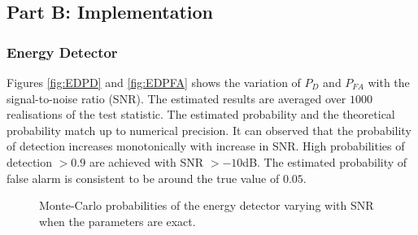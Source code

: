 \documentclass[11pt]{article}
\begin{document}

\subsection*{Part B: Implementation}
\label{subsec:partB}



\subsubsection*{Energy Detector}
\label{subsubsec:energyDetectorImplementation}


Figures \ref{fig:EDPD} and \ref{fig:EDPFA} shows the variation of $P_{D}$ and $P_{FA}$ with the signal-to-noise ratio (SNR). The estimated results are averaged over $1000$ realisations of the test statistic. The estimated probability and the theoretical probability match up to numerical precision. It can observed that the probability of detection increases monotonically with increase in SNR. High probabilities of detection $>0.9$ are achieved with SNR $>-10$dB. The estimated probability of false alarm is consistent to be around the true value of $0.05$.
\begin{figure}[h]
\centering
{}
\caption{Monte-Carlo probabilities of the energy detector varying with SNR when the parameters are exact.}
\label{fig:ED_exact}
\end{figure}
\end{document}
